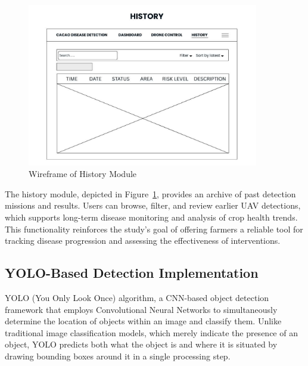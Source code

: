 \begin{figure}[H]
	\centering
	\caption{Wireframe of History Module}
	\label{fig:HistoryGUI}
	\includegraphics[width=0.9\textwidth]{figures/History.pdf}
\end{figure}

The history module, depicted in Figure~\ref{fig:HistoryGUI}, provides an archive of past detection missions and results. Users can browse, filter, and review earlier UAV detections, which supports long-term disease monitoring and analysis of crop health trends. This functionality reinforces the study’s goal of offering farmers a reliable tool for tracking disease progression and assessing the effectiveness of interventions.

\subsection*{YOLO-Based Detection Implementation}
YOLO (You Only Look Once) algorithm, a CNN-based object detection framework that employs Convolutional Neural Networks to simultaneously determine the location of objects within an image and classify them. Unlike traditional image classification models, which merely indicate the presence of an object, YOLO predicts both what the object is and where it is situated by drawing bounding boxes around it in a single processing step.

